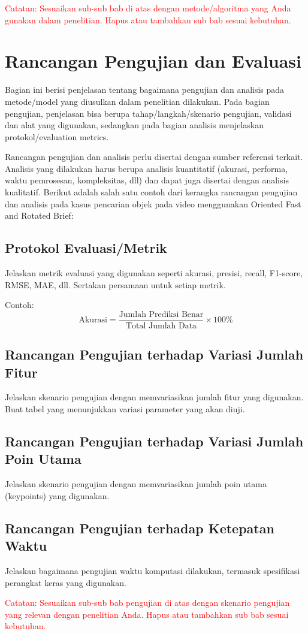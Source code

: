 \textcolor{red}{Catatan: Sesuaikan sub-sub bab di atas dengan metode/algoritma yang Anda gunakan dalam penelitian. Hapus atau tambahkan sub bab sesuai kebutuhan.}

\section{Rancangan Pengujian dan Evaluasi}

Bagian ini berisi penjelasan tentang bagaimana pengujian dan analisis pada metode/model yang diusulkan dalam penelitian dilakukan. Pada bagian pengujian, penjelasan bisa berupa tahap/langkah/skenario pengujian, validasi dan alat yang digunakan, sedangkan pada bagian analisis menjelaskan protokol/evaluation metrics.

Rancangan pengujian dan analisis perlu disertai dengan sumber referensi terkait. Analisis yang dilakukan harus berupa analisis kuantitatif (akurasi, performa, waktu pemrosesan, kompleksitas, dll) dan dapat juga disertai dengan analisis kualitatif. Berikut adalah salah satu contoh dari kerangka rancangan pengujian dan analisis pada kasus pencarian objek pada video menggunakan Oriented Fast and Rotated Brief:

\subsection{Protokol Evaluasi/Metrik}

Jelaskan metrik evaluasi yang digunakan seperti akurasi, presisi, recall, F1-score, RMSE, MAE, dll. Sertakan persamaan untuk setiap metrik.

Contoh:
\begin{equation}
	\text{Akurasi} = \frac{\text{Jumlah Prediksi Benar}}{\text{Total Jumlah Data}} \times 100\%
\end{equation}

\subsection{Rancangan Pengujian terhadap Variasi Jumlah Fitur}

Jelaskan skenario pengujian dengan memvariasikan jumlah fitur yang digunakan. Buat tabel yang menunjukkan variasi parameter yang akan diuji.

\subsection{Rancangan Pengujian terhadap Variasi Jumlah Poin Utama}

Jelaskan skenario pengujian dengan memvariasikan jumlah poin utama (keypoints) yang digunakan.

\subsection{Rancangan Pengujian terhadap Ketepatan Waktu}

Jelaskan bagaimana pengujian waktu komputasi dilakukan, termasuk spesifikasi perangkat keras yang digunakan.

\textcolor{red}{Catatan: Sesuaikan sub-sub bab pengujian di atas dengan skenario pengujian yang relevan dengan penelitian Anda. Hapus atau tambahkan sub bab sesuai kebutuhan.}
